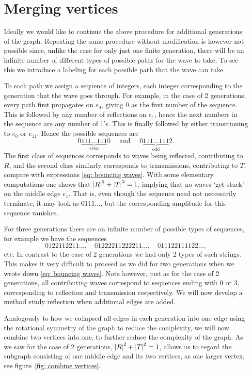 \section{Merging vertices}

Ideally we would like to continue the above procedure for additional generations of the graph. Repeating the same procedure without modification is however not possible since, unlike the case for only just one finite generation, there will be an infinite number of different types of possible paths for the wave to take. To see this we introduce a labeling for each possible path that the wave can take.

To each path we assign a sequence of integers, each integer corresponding to the generation that the wave goes through. For example, in the case of 2 generations, every path first propagates on $e_0$, giving 0 as the first number of the sequence. This is followed by any number of reflections on $e_1$, hence the next numbers in the sequence are any number of 1's. This is finally followed by either transitioning to $e_0$ or $e_{11}$. Hence the possible sequences are
\[ 0\underbrace{111\ldots111}_{\text{even}}0 \quad \text{ and } \quad 0\underbrace{111\ldots111}_{\text{odd}}2. \]
The first class of sequences corresponds to waves being reflected, contributing to $R$, and the second class similarly corresponds to transmissions, contributing to $T$, compare with expressions \eqref{eq: bouncing waves}. With some elementary computations one shows that $\left\lvert R\right\rvert^2 + \left\lvert T\right\rvert^2 = 1$, implying that no waves `get stuck' on the middle edge $e_1$. That is, even though the sequence need not necessarily terminate, it may look as $0111\ldots$, but the corresponding amplitude for this sequence vanishes.

For three generations there are an infinite number of possible types of sequences, for example we have the sequences
\[ 0122112211\ldots, \quad 01222211222211\ldots, \quad 011122111122\ldots, \]
etc. In contrast to the case of 2 generations we had only $2$ types of such strings. This makes it very difficult to proceed as we did for two generations when we wrote down \eqref{eq: bouncing waves}. Note however, just as for the case of 2 generations, all contributing waves correspond to sequences ending with 0 or 3, corresponding to reflection and transmission respectively. We will now develop a method study reflection when additional edges are added.

Analogously to how we collapsed all edges in each generation into one edge using the rotational symmetry of the graph to reduce the complexity, we will now combine two vertices into one, to further reduce the complexity of the graph. As we saw for the case of 2 generations, $\left\lvert R\right\rvert^2 + \left\lvert T\right\rvert^2 = 1$, allows us to regard the subgraph consisting of one middle edge and its two vertices, as one larger vertex, see figure~\ref{fig: combine vertices}.

